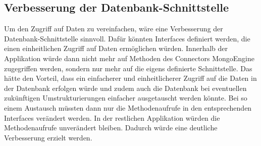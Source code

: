 \subsection{Verbesserung der Datenbank-Schnittstelle}
Um den Zugriff auf Daten zu vereinfachen, wäre eine Verbesserung der Datenbank-Schnittstelle sinnvoll. Dafür könnten Interfaces definiert werden, die einen einheitlichen Zugriff auf Daten ermöglichen würden. Innerhalb der Applikation würde dann nicht mehr auf Methoden des Connectors MongoEngine zugegriffen werden, sondern nur mehr auf die eigens definierte Schnittstelle. Das hätte den Vorteil, dass ein einfacherer und einheitlicherer Zugriff auf die Daten in der Datenbank erfolgen würde und zudem auch die Datenbank bei eventuellen zukünftigen Umstrukturierungen einfacher ausgetauscht werden könnte. Bei so einem Austausch müssten dann nur die Methodenaufrufe in den entsprechenden Interfaces verändert werden. In der restlichen Applikation würden die Methodenaufrufe unverändert bleiben. Dadurch würde eine deutliche Verbesserung erzielt werden.
